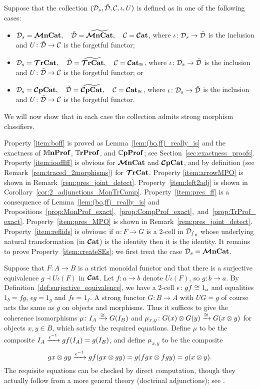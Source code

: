 \documentclass[11pt,oneside,article]{memoir}
\begin{document}
\begin{example}
      \label{ex:strictifiable}
Suppose that the collection $(\mathcal{D}_s,\tilde{\mathcal{D}},\mathcal{C},\iota,U)$ is defined as in one of the
following cases:
\begin{itemize}
   \item $\mathcal{D}_s=\bm{\mathcal{M}}\mathbf{nCat}, \quad \tilde{\mathcal{D}}=\widetilde{\bm{\mathcal{M}}\mathbf{nCat}}, \quad \mathcal{C}=\bm{\mathcal{C}}\mathbf{at}$, where
      $\iota\colon\mathcal{D}_s\to\tilde{\mathcal{D}}$ is the inclusion and $U\colon\tilde{\mathcal{D}}\to\mathcal{C}$ is the
      forgetful functor;
   \item $\mathcal{D}_s=\bm{\mathcal{T}}\mathbf{rCat}, \quad \tilde{\mathcal{D}}=\widetilde{\bm{\mathcal{T}}\mathbf{rCat}}, \quad \mathcal{C}=\bm{\mathcal{C}}\mathbf{at}_{\cong}$, where
      $\iota\colon\mathcal{D}_s\to\tilde{\mathcal{D}}$ is the inclusion and $U\colon\tilde{\mathcal{D}}\to\mathcal{C}$ is the
      forgetful functor; or
   \item $\mathcal{D}_s=\bm{\mathcal{C}}\mathbf{pCat}, \quad \tilde{\mathcal{D}}=\widetilde{\bm{\mathcal{C}}\mathbf{pCat}}, \quad \mathcal{C}=\bm{\mathcal{C}}\mathbf{at}_{\cong}$, where
      $\iota\colon\mathcal{D}_s\to\tilde{\mathcal{D}}$ is the inclusion and $U\colon\tilde{\mathcal{D}}\to\mathcal{C}$ is the
      forgetful functor.
\end{itemize}
We will now show that in each case the collection admits strong morphism classifiers.

Property \ref{item:boff} is proved as Lemma~\ref{lem:(bo,ff)_really_is} and the exactness of
$\mathbb{M}\mathbf{nProf}$, $\mathbb{T}\mathbf{rProf}$, and $\mathbb{C}\mathbf{pProf}$; see Section~\ref{sec:exactness_proofs}. Property
\ref{item:ioofflff} is obvious for $\bm{\mathcal{M}}\mathbf{nCat}$ and $\bm{\mathcal{C}}\mathbf{pCat}$, and by definition (see
Remark~\ref{rem:traced_2morphisms}) for $\bm{\mathcal{T}}\mathbf{rCat}$.  Property \ref{item:arrowMPO} is shown in
Remark~\ref{rem:pres_joint_detect}. Property~\ref{item:left2adj} is shown in
Corollary~\ref{cor:2_adjunctions_MonTrComp}. Property~\ref{item:pres_ff} is a consequence of Lemma~\ref{lem:(bo,ff)_really_is} and Propositions~\ref{prop:MonProf_exact},~\ref{prop:CompProf_exact},~and~\ref{prop:TrProf_exact}. Property~\ref{item:pres_MPO} is shown in
Remark~\ref{rem:pres_joint_detect}. Property~\ref{item:reflids} is obvious: if $\alpha\colon F\to G$
is a 2-cell in $\mathcal{D_s}_s$ whose underlying natural transformation (in $\bm{\mathcal{C}}\mathbf{at}$) is the identity
then it is the identity. It remains to prove Property~\ref{item:createSEs}; we first treat the case
$\mathcal{D}_s=\bm{\mathcal{M}}\mathbf{nCat}$.

Suppose that $F\colon A\to B$ is a strict monoidal functor and that there is a surjective
equivalence $g\dashv U\iota(F)$ in $\bm{\mathcal{C}}\mathbf{at}$. Let $f\colon a\to b$ denote $U\iota(F)$, so $g\colon
b\to a$. By Definition~\ref{def:surjective_equivalence}, we have a 2-cell $\epsilon\colon gf\cong
1_a$ and equalities $1_b=fg$, $\epsilon g=1_g$ and $f\epsilon=1_f$. A strong functor $G\colon B\to
A$ with $UG=g$ of course acts the same as $g$ on objects and morphisms. Thus it suffices to give the
coherence isomorphisms $\mu\colon I_A\xrightarrow{\cong}G(I_B)$ and $\mu_{x,y}\colon G(x)\otimes
G(y)\xrightarrow{\cong} G(x\otimes y)$ for objects $x,y\in B$, which satisfy the required equations. Define
$\mu$ to be the composite $I_A\xrightarrow{\epsilon^{-1}}gf(I_A)=g(I_B)$, and define $\mu_{x,y}$ to be the
composite
\[
   gx\otimes gy\xrightarrow{\epsilon^{-1}}gf(gx\otimes gy)=g(fgx\otimes fgy)=g(x\otimes y).
\]
The requisite equations can be checked by direct computation, though they actually follow from a
more general theory (doctrinal adjunctions); see \cite{Kelly}.


\end{example}
\end{document}
